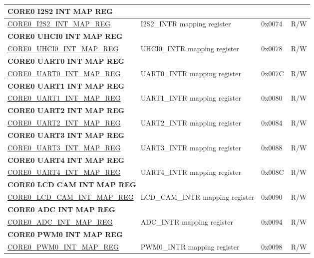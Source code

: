 \begin{longtable}{ | p{7.5cm} | p{7.2cm} | p{1.3cm} | p{1cm} | }
\multicolumn{4}{|l|}{\textbf{CORE0 I2S2 INT MAP REG}} \\ \hline
\hyperref[regdesc:CORE0I2S2INTMAPREG]{CORE0\_I2S2\_INT\_MAP\_REG} & I2S2\_INTR mapping register & 0x0074 & R/W \\ \hline
\multicolumn{4}{|l|}{\textbf{CORE0 UHCI0 INT MAP REG}} \\ \hline
\hyperref[regdesc:CORE0UHCI0INTMAPREG]{CORE0\_UHCI0\_INT\_MAP\_REG} & UHCI0\_INTR mapping register & 0x0078 & R/W \\ \hline
\multicolumn{4}{|l|}{\textbf{CORE0 UART0 INT MAP REG}} \\ \hline
\hyperref[regdesc:CORE0UART0INTMAPREG]{CORE0\_UART0\_INT\_MAP\_REG} & UART0\_INTR mapping register & 0x007C & R/W \\ \hline
\multicolumn{4}{|l|}{\textbf{CORE0 UART1 INT MAP REG}} \\ \hline
\hyperref[regdesc:CORE0UART1INTMAPREG]{CORE0\_UART1\_INT\_MAP\_REG} & UART1\_INTR mapping register & 0x0080 & R/W \\ \hline
\multicolumn{4}{|l|}{\textbf{CORE0 UART2 INT MAP REG}} \\ \hline
\hyperref[regdesc:CORE0UART2INTMAPREG]{CORE0\_UART2\_INT\_MAP\_REG} & UART2\_INTR mapping register & 0x0084 & R/W \\ \hline
\multicolumn{4}{|l|}{\textbf{CORE0 UART3 INT MAP REG}} \\ \hline
\hyperref[regdesc:CORE0UART3INTMAPREG]{CORE0\_UART3\_INT\_MAP\_REG} & UART3\_INTR mapping register & 0x0088 & R/W \\ \hline
\multicolumn{4}{|l|}{\textbf{CORE0 UART4 INT MAP REG}} \\ \hline
\hyperref[regdesc:CORE0UART4INTMAPREG]{CORE0\_UART4\_INT\_MAP\_REG} & UART4\_INTR mapping register & 0x008C & R/W \\ \hline
\multicolumn{4}{|l|}{\textbf{CORE0 LCD CAM INT MAP REG}} \\ \hline
\hyperref[regdesc:CORE0LCDCAMINTMAPREG]{CORE0\_LCD\_CAM\_INT\_MAP\_REG} & LCD\_CAM\_INTR mapping register & 0x0090 & R/W \\ \hline
\multicolumn{4}{|l|}{\textbf{CORE0 ADC INT MAP REG}} \\ \hline
\hyperref[regdesc:CORE0ADCINTMAPREG]{CORE0\_ADC\_INT\_MAP\_REG} & ADC\_INTR mapping register & 0x0094 & R/W \\ \hline
\multicolumn{4}{|l|}{\textbf{CORE0 PWM0 INT MAP REG}} \\ \hline
\hyperref[regdesc:CORE0PWM0INTMAPREG]{CORE0\_PWM0\_INT\_MAP\_REG} & PWM0\_INTR mapping register & 0x0098 & R/W \\ \hline

\end{longtable}
